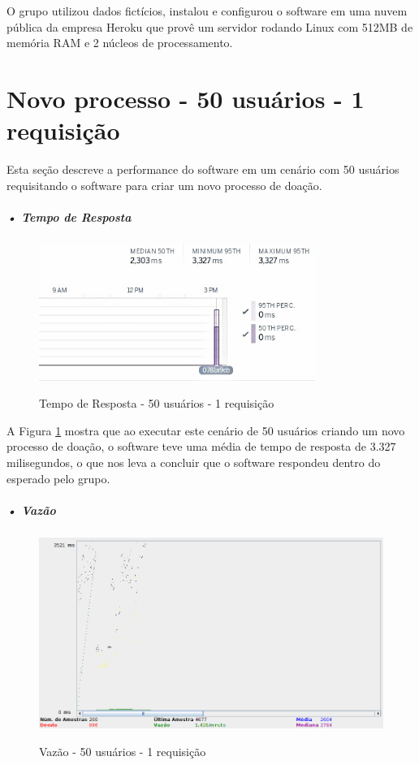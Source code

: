 \documentclass[portuguese,oneside]{tcc}
\begin{document}
O grupo utilizou dados fictícios, instalou e configurou o software em uma nuvem pública da empresa Heroku que provê um servidor rodando Linux com 512MB de memória RAM e 2 núcleos de processamento.  

\section{Novo processo - 50 usuários - 1 requisição}
Esta seção descreve a performance do software em um cenário com 50 usuários requisitando o software para criar um novo processo de doação.

\subparagraph{• Tempo de Resposta}
\begin{figure}[htp]
\centering
\caption{Tempo de Resposta - 50 usuários - 1 requisição}
\includegraphics[width=9cm]{50-1-response-time}
\label{fig:tempo-reposta-50-1}
\end{figure}

A Figura \ref{fig:tempo-reposta-50-1} mostra que ao executar este cenário de 50 usuários criando um novo processo de doação, o software teve uma média de tempo de resposta de 3.327 milisegundos, o que nos leva a concluir que o software respondeu dentro do esperado pelo grupo.

\newpage

\subparagraph{• Vazão}
\begin{figure}[htp]
\centering
\caption{Vazão - 50 usuários - 1 requisição}
\includegraphics[width=15cm]{50-1-throughput}
\label{fig:throughput-50-1}
\end{figure}
\end{document}
